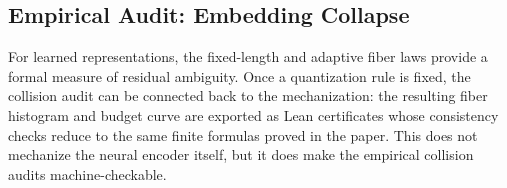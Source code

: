 \subsection{Empirical Audit: Embedding Collapse}

For learned representations, the fixed-length and adaptive fiber laws provide a formal measure of residual ambiguity. Once a quantization rule is fixed, the collision audit can be connected back to the mechanization: the resulting fiber histogram and budget curve are exported as Lean certificates whose consistency checks reduce to the same finite formulas proved in the paper. This does not mechanize the neural encoder itself, but it does make the empirical collision audits machine-checkable.


